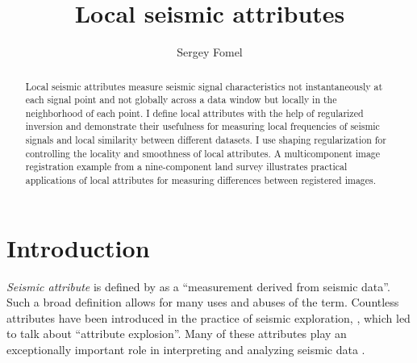 \title{Local seismic attributes}

\author{Sergey Fomel}



\address{Bureau of Economic Geology, \\
John A. and Katherine G. Jackson School of Geosciences \\
The University of Texas at Austin \\
University Station, Box X \\
Austin, TX 78713-8972}

\maketitle

\begin{abstract}
  Local seismic attributes measure seismic signal characteristics not
  instantaneously at each signal point and not globally across a data
  window but locally in the neighborhood of each point. I define local
  attributes with the help of regularized inversion and demonstrate
  their usefulness for measuring local frequencies of seismic signals
  and local similarity between different datasets. I use shaping regularization for
  controlling the locality and smoothness of local attributes. A
  multicomponent image registration example from a nine-component land
  survey illustrates practical applications of local attributes for
  measuring  differences between registered
  images.
\end{abstract}

\section{Introduction}

\emph{Seismic attribute} is defined by \cite{EDG00-00-03840384} as a
``measurement derived from seismic data''. Such a broad definition
allows for many uses and abuses of the term. Countless attributes have
been introduced in the practice of seismic exploration,
\cite[]{TLE15-10-10901090,TLE16-05-04450456}, 
which led \cite{TLE21-10-09940994} to talk about ``attribute
explosion''.  Many of these attributes play an exceptionally important
role in interpreting and analyzing seismic data \cite[]{marfurt}.

